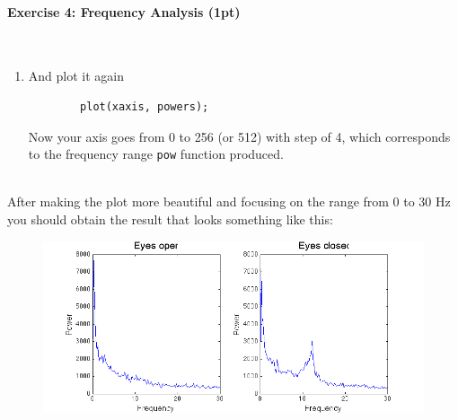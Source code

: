 \documentclass[a4paper,11pt]{article}
\newenvironment{exercise}[3]{\paragraph{Exercise #1: #2 (#3pt)}\ \\}{
\medskip}
\begin{document}
\begin{exercise}{4}{Frequency Analysis}{1}
\begin{enumerate}
		\begin{verbatim}
		dt = 1/512;             % time step
df = 1/4;               % frequency step
fNQ = 1/dt/2;           % fNQ is the maximal frequency, in our case it is 256
                        %   if you have discarded part of the data in step 5 
                        %   or 512 if you did not
xaxis = (0:df:fNQ-df);  % points for your X axis, should be of the same length 
                        %   as the vector of frequencies
		\end{verbatim}
	\item And plot it again
		\begin{verbatim}
		plot(xaxis, powers);
		\end{verbatim}
		Now your axis goes from 0 to 256 (or 512) with step of 4, which corresponds to the frequency range \texttt{pow} function produced.
\end{enumerate}

\ \\
After making the plot more beautiful and focusing on the range from 0 to 30 Hz you should obtain the result that looks something like this:
\begin{figure}[H]
   \centering
   \includegraphics[width=1\textwidth]{fouriereyes.png} 
\end{figure}
\end{exercise}
\end{document}
